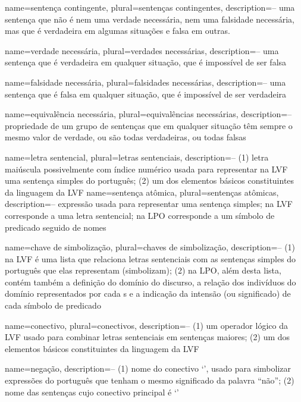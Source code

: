 {
name=sentença contingente,
plural=sentenças contingentes,
description={-- uma sentença que não é nem uma verdade necessária, nem uma falsidade necessária, mas que é verdadeira em algumas situações e falsa em outras.}
}


{
name={verdade necessária},
plural={verdades necessárias},
description={-- uma sentença que é verdadeira em qualquer situação, que é impossível de ser falsa}
}

{
name={falsidade necessária},
plural={falsidades necessárias},
description={-- uma sentença que é falsa em qualquer situação, que é impossível de ser verdadeira}
}

{
name={equivalência necessária},
plural={equivalências necessárias},
description={-- propriedade de um grupo de sentenças que em qualquer situação têm sempre o mesmo valor de verdade, ou são todas verdadeiras, ou todas falsas}
}

{
name=letra sentencial,
plural=letras sentenciais,
description={-- (1) letra maiúscula possivelmente com índice numérico usada para representar na LVF uma sentença simples do português; (2) um dos elementos básicos constituintes da linguagem da LVF}
}
{
name=sentença atômica,
plural=sentenças atômicas,
description={-- expressão usada para representar uma sentença simples; na LVF corresponde a uma letra sentencial; na LPO corresponde a um símbolo de predicado seguido de nomes}
}

{
name=chave de simbolização,
plural=chaves de simbolização,
description={-- (1) na LVF é uma lista que relaciona letras sentenciais com as sentenças simples do português que elas representam (simbolizam); (2) na LPO, além desta lista, contém também a definição do domínio do discurso, a relação dos indivíduos do domínio representados por cada s e a indicação da intensão (ou significado) de cada símbolo de predicado}
}

{
name=conectivo,
plural=conectivos,
description={-- (1) um operador lógico da LVF usado para combinar letras sentenciais em sentenças maiores; (2) um dos elementos básicos constituintes da linguagem da LVF}
}

{
name=negação,
description={-- (1) nome do conectivo `\enot', usado para simbolizar expressões do português que tenham o mesmo significado da palavra ``não''; (2) nome das sentenças cujo conectivo principal é `\enot'}
}

